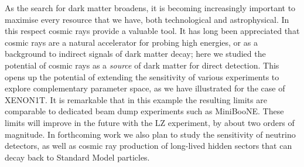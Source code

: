 As the search for dark matter broadens, it is becoming increasingly important to maximise every resource that we have, both technological and astrophysical. In this respect cosmic rays provide a valuable tool. It has long been appreciated that cosmic rays are a natural accelerator for probing high energies, or as a background to indirect signals of dark matter decay; here we studied the potential of cosmic rays as a {\it source} of dark matter for direct detection. This opens up the potential of extending the sensitivity of various experiments to explore complementary parameter space, as we have illustrated for the case of XENON1T. It is remarkable that in this example the resulting limits are comparable to dedicated beam dump experiments such as MiniBooNE. These limits will improve in the future with the LZ experiment, by about two orders of magnitude. In forthcoming work we also plan to study the sensitivity of neutrino detectors, as well as cosmic ray production of long-lived hidden sectors that can decay back to Standard Model particles.